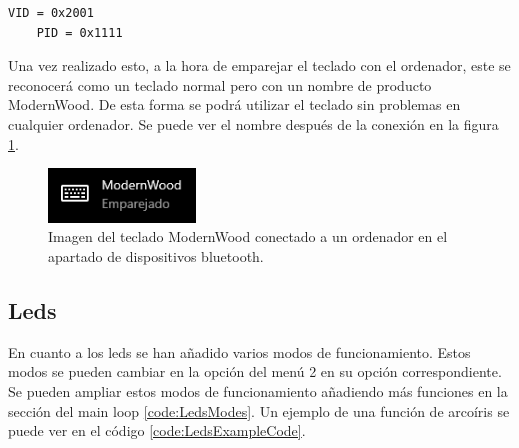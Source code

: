 \begin{lstlisting}[style=console, language=bash, caption={Números elegidos para el PID/VID}, label={code:PIDVID}]
    VID = 0x2001
    PID = 0x1111
\end{lstlisting}

Una vez realizado esto, a la hora de emparejar el teclado con el ordenador, este se reconocerá como un teclado normal pero con un nombre de producto ModernWood. De esta forma se podrá utilizar el teclado sin problemas en cualquier ordenador. Se puede ver el nombre después de la conexión en la figura \ref{fig:ModernWoodLinked}.

\begin{figure}[H]
    \centering
    \includegraphics[width=0.35\textwidth]{imagenes/Capitulos/Cap13/ModernWoodLinked.png}
    \caption{Imagen del teclado ModernWood conectado a un ordenador en el apartado de dispositivos bluetooth.}
    \label{fig:ModernWoodLinked}
\end{figure}

\subsection{Leds}\label{ApendiceLeds}

En cuanto a los leds se han añadido varios modos de funcionamiento. Estos modos se pueden cambiar en la opción del menú 2 en su opción correspondiente. Se pueden ampliar estos modos de funcionamiento añadiendo más funciones en la sección del main loop \ref{code:LedsModes}. Un ejemplo de una función de arcoíris se puede ver en el código \ref{code:LedsExampleCode}.

